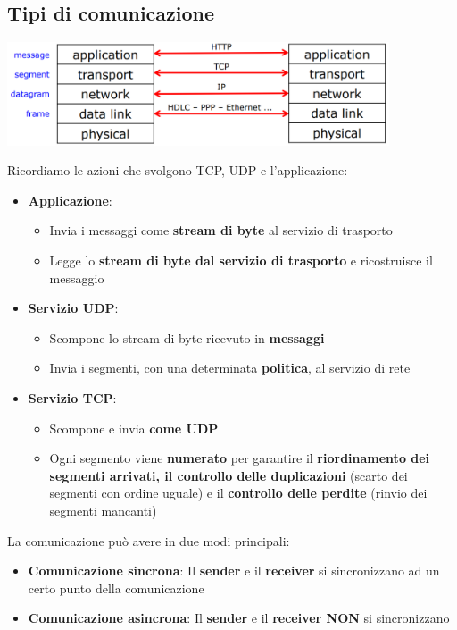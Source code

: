 \documentclass[12pt]{article}
\begin{document}
\subsection{Tipi di comunicazione}
\begin{center}
    \includegraphics[width = 0.85\textwidth]{Images/128.PNG}
\end{center}
Ricordiamo le azioni che svolgono TCP, UDP e l'applicazione:
\begin{itemize}
    \item \textbf{Applicazione}:
          \begin{itemize}
              \item Invia i messaggi come \textbf{stream di byte} al servizio di trasporto
              \item Legge lo \textbf{stream di byte dal servizio di trasporto} e ricostruisce il messaggio
          \end{itemize}
    \item \textbf{Servizio UDP}:
          \begin{itemize}
              \item Scompone lo stream di byte ricevuto in \textbf{messaggi}
              \item Invia i segmenti, con una determinata \textbf{politica}, al servizio di rete
          \end{itemize}
    \item \textbf{Servizio TCP}:
          \begin{itemize}
              \item Scompone e invia \textbf{come UDP}
              \item Ogni segmento viene \textbf{numerato} per garantire il \textbf{riordinamento dei segmenti arrivati, il controllo delle duplicazioni} (scarto dei segmenti con ordine uguale) e il \textbf{controllo delle perdite} (rinvio dei segmenti mancanti)
          \end{itemize}
\end{itemize}
La comunicazione può avere in due modi principali:
\begin{itemize}
    \item \textbf{Comunicazione sincrona}: Il \textbf{sender} e il \textbf{receiver} si sincronizzano ad un certo punto della comunicazione
    \item \textbf{Comunicazione asincrona}: Il \textbf{sender} e il \textbf{receiver NON} si sincronizzano
\end{itemize}
\end{document}
